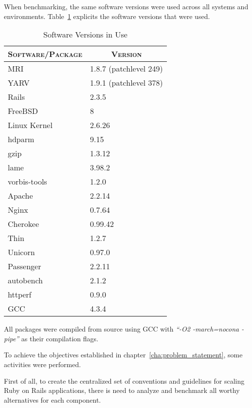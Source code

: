 When benchmarking, the same software versions were used across all systems and environments. Table~\ref{tab:software_versions} explicits the software versions that were used.
\begin{table}[ht]
  \centering
  \caption{Software Versions in Use}
  \label{tab:software_versions}
  
  \begin{tabular}{p{}|p{}}
    \multicolumn{1}{c|}{\textbf{\textsc{Software/Package}}} & \multicolumn{1}{c}{\textbf{\textsc{Version}}} \\ \hline
    
    MRI & 1.8.7 (patchlevel 249) \\ \hline
    YARV & 1.9.1 (patchlevel 378) \\ \hline
    Rails & 2.3.5 \\ \hline
    FreeBSD & 8 \\ \hline
    Linux Kernel & 2.6.26 \\ \hline
    hdparm & 9.15 \\ \hline
    gzip & 1.3.12 \\ \hline
    lame & 3.98.2 \\ \hline
    vorbis-tools & 1.2.0 \\ \hline
    Apache & 2.2.14 \\ \hline
    Nginx & 0.7.64 \\ \hline
    Cherokee & 0.99.42 \\ \hline
    Thin & 1.2.7 \\ \hline
    Unicorn & 0.97.0 \\ \hline
    Passenger & 2.2.11 \\ \hline
    autobench & 2.1.2 \\ \hline
    httperf & 0.9.0 \\ \hline
    GCC & 4.3.4 \\
        
  \end{tabular}
\end{table}
All packages were compiled from source using GCC with \textit{``-O2 -march=nocona -pipe''} as their compilation flags.

To achieve the objectives established in chapter~\ref{cha:problem_statement}, some activities were performed.

First of all, to create the centralized set of conventions and guidelines for scaling Ruby on Rails applications, there is need to analyze and benchmark all worthy alternatives for each component.

